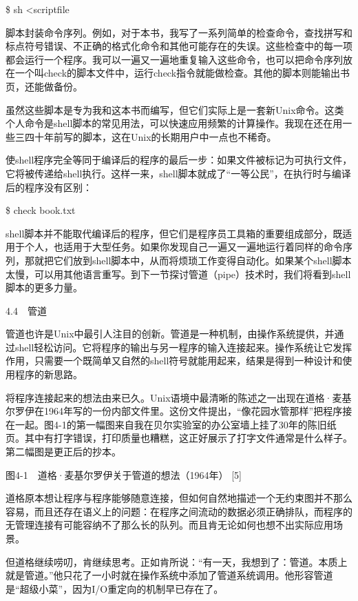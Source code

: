 \documentclass[a4paper,12pt,UTF8,twoside]{ctexbook}
\begin{document}
{\$ sh <scriptfile

脚本封装命令序列。例如，对于本书，我写了一系列简单的检查命令，查找拼写和标点符号错误、不正确的格式化命令和其他可能存在的失误。这些检查中的每一项都会运行一个程序。我可以一遍又一遍地重复输入这些命令，也可以把命令序列放在一个叫check的脚本文件中，运行check指令就能做检查。其他的脚本则能输出书页，还能做备份。

虽然这些脚本是专为我和这本书而编写，但它们实际上是一套新Unix命令。这类个人命令是shell脚本的常见用法，可以快速应用频繁的计算操作。我现在还在用一些三四十年前写的脚本，这在Unix的长期用户中一点也不稀奇。

使shell程序完全等同于编译后的程序的最后一步：如果文件被标记为可执行文件，它将被传递给shell执行。这样一来，shell脚本就成了“一等公民”，在执行时与编译后的程序没有区别：

\$ check book.txt

shell脚本并不能取代编译后的程序，但它们是程序员工具箱的重要组成部分，既适用于个人，也适用于大型任务。如果你发现自己一遍又一遍地运行着同样的命令序列，那就把它们放到shell脚本中，从而将烦琐工作变得自动化。如果某个shell脚本太慢，可以用其他语言重写。到下一节探讨管道（pipe）技术时，我们将看到shell脚本的更多力量。





4.4　管道


管道也许是Unix中最引人注目的创新。管道是一种机制，由操作系统提供，并通过shell轻松访问。它将程序的输出与另一程序的输入连接起来。操作系统让它发挥作用，只需要一个既简单又自然的shell符号就能用起来，结果是得到一种设计和使用程序的新思路。

将程序连接起来的想法由来已久。Unix语境中最清晰的陈述之一出现在道格·麦基尔罗伊在1964年写的一份内部文件里。这份文件提出，“像花园水管那样”把程序接在一起。图4-1的第一幅图来自我在贝尔实验室的办公室墙上挂了30年的陈旧纸页。其中有打字错误，打印质量也糟糕，这正好展示了打字文件通常是什么样子。第二幅图是更正后的抄本。





图4-1　道格·麦基尔罗伊关于管道的想法（1964年） [5]

道格原本想让程序与程序能够随意连接，但如何自然地描述一个无约束图并不那么容易，而且还存在语义上的问题：在程序之间流动的数据必须正确排队，而程序的无管理连接有可能容纳不了那么长的队列。而且肯无论如何也想不出实际应用场景。

但道格继续唠叨，肯继续思考。正如肯所说：“有一天，我想到了：管道。本质上就是管道。”他只花了一小时就在操作系统中添加了管道系统调用。他形容管道是“超级小菜”，因为I/O重定向的机制早已存在了。

}
\end{document}
